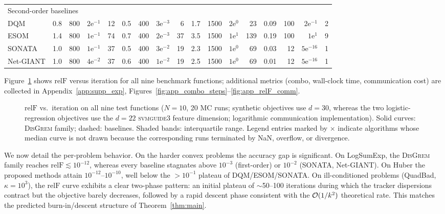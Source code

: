 \documentclass[review,onefignum,onetabnum]{siamart171218}
\begin{document}
\begin{table}[htbp]
{\begin{tabular}{l rrrr rrrr rrrr rrrr}
				\midrule
				\multicolumn{17}{l}{Second-order baselines} \\
				DQM    & 0.8 & 800 & $2\mathrm{e}^{-1}$  & 12
				& 0.5 & 400 & $3\mathrm{e}^{-3}$  & 6
				& 1.7 & 1500 & $2\mathrm{e}^{0}$   & 23
				& 0.09 & 100 & $2\mathrm{e}^{-1}$  & 2 \\
				ESOM   & 1.4 & 800 & $1\mathrm{e}^{-1}$  & 74
				& 0.7 & 400 & $2\mathrm{e}^{-3}$  & 37
				& 3.5 & 1500 & $1\mathrm{e}^{1}$   & 139
				& 0.19 & 100 & $1\mathrm{e}^{1}$   & 9 \\
				SONATA & 1.0 & 800 & $1\mathrm{e}^{-1}$  & 37
				& 0.5 & 400 & $3\mathrm{e}^{-2}$  & 19
				& 2.3 & 1500 & $1\mathrm{e}^{0}$   & 69
				& 0.03 & 12  & $5\mathrm{e}^{-16}$ & 1 \\
				Net-GIANT & 1.0 & 800 & $4\mathrm{e}^{-2}$ & 37
				& 0.6 & 400 & $1\mathrm{e}^{-2}$  & 19
				& 2.5 & 1500 & $1\mathrm{e}^{0}$   & 69
				& 0.01 & 12  & $5\mathrm{e}^{-16}$ & 1 \\
				\bottomrule
		\end{tabular}}
	\end{table}
	
	Figure~\ref{fig:relF_steps_all} shows $\mathrm{relF}$ versus iteration for
	all nine benchmark functions; additional metrics (combo, wall-clock
	time, communication cost) are collected in
	Appendix~\ref{app:supp_exp},
	Figures~\ref{fig:app_combo_steps}--\ref{fig:app_relF_comm}.
	
	\begin{figure}[htbp]
		\centering
		\caption{$\mathrm{relF}$ vs.\ iteration on all nine test functions
			($N{=}10$, 20 MC runs; synthetic objectives use $d{=}30$,
			whereas the two logistic-regression objectives use the
			$d{=}22$ \textsc{svmguide3} feature dimension; logarithmic
			communication implementation).
			Solid curves: \textsc{DisGrem} family; dashed: baselines.
			Shaded bands: interquartile range.
			Legend entries marked by $\times$ indicate algorithms whose
			median curve is not drawn because the corresponding runs
			terminated by NaN, overflow, or divergence.}
		\label{fig:relF_steps_all}
	\end{figure}
	
	We now detail the per-problem behavior.
	On the harder convex problems the accuracy gap is significant.
	On LogSumExp, the \textsc{DisGrem} family reaches
	$\mathrm{relF}\lesssim10^{-12}$, whereas every baseline
	stagnates above $10^{-3}$ (first-order) or $10^{-2}$
	(SONATA, Net-GIANT).
	On Huber the proposed methods attain $10^{-12}$--$10^{-10}$, well
	below the $>10^{-1}$ plateau of DQM/ESOM/SONATA.
	On ill-conditioned problems (QuadBad, $\kappa{=}10^3$), the $\mathrm{relF}$
	curve exhibits a clear two-phase pattern: an initial plateau of
	$\sim$50--100 iterations during which the tracker dispersions
	contract but the objective barely decreases, followed by a rapid
	descent phase consistent with the $\mathcal{O}(1/k^2)$ theoretical rate.
	This matches the predicted burn-in/descent structure of
	Theorem~\ref{thm:main}.
	
\end{document}
